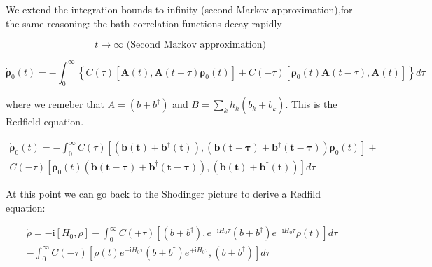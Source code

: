 \documentclass[reprint,aps,onecolumn,pra,notitlepage,nofootinbib]{revtex4-1}
\theoremstyle{definition}
\numberwithin{equation}{section}
\begin{document}
We extend the integration bounds
to infinity (second Markov approximation),for the same reasoning: the bath correlation
functions decay rapidly

\begin{equation}
t \rightarrow \infty \text { (Second Markov approximation) }
\end{equation}


\begin{equation}
\dot{\boldsymbol{\rho}}_0(t) = -\int_{0}^{\infty}\left\{C(\tau)\left[\boldsymbol{A}(t), \boldsymbol{A}(t-\tau) \boldsymbol{\rho}_{\mathrm{0}}(t)\right]+C(-\tau)\left[\boldsymbol{\rho}_{\mathrm{0}}(t) \boldsymbol{A}(t-\tau), \boldsymbol{A}(t)\right]\right\} d \tau
\end{equation}



where we remeber that $A= \left( b + b ^{\dagger} \right) $ and $B= \sum_k h_k \left( b_k + b_k ^{\dagger} \right)$. This is the Redfield equation. 


\begin{equation}\begin{align}
\dot{\boldsymbol{\rho}}_0(t) = - \int_{0}^{\infty} C(\tau)\left[\boldsymbol{\left( b(t) + b ^{\dagger}(t) \right)}, \left( \boldsymbol{ b(t-\tau) + b ^{\dagger} (t-\tau) }\right) \boldsymbol{\rho}_{\mathrm{0}}(t)\right]+ \\
C(-\tau)\left[\boldsymbol{\rho}_{\mathrm{0}}(t) \left( \boldsymbol{ b(t-\tau) + b ^{\dagger} (t-\tau) } \right), \boldsymbol{\left( b(t) + b ^{\dagger}(t) \right)}\right] d \tau 
\end{align}
\end{equation}






At this point we can go back to the Shodinger picture to derive a Redfild equation: 

\begin{equation}
\begin{aligned}
\dot{\rho}=-\mathrm{i}\left[H_{0}, \rho\right]-\int_{0}^{\infty} C(+\tau)\left[\left(b+b^{\dagger}\right), e^{-\mathrm{i} H_{0} \tau}\left(b+b^{\dagger}\right) e^{+\mathrm{i} H_{0} \tau} \rho(t)\right] d \tau \\
-\int_{0}^{\infty} C(-\tau)\left[\rho(t) e^{-\mathrm{i} H_{0} \tau}\left(b+b^{\dagger}\right) e^{+\mathrm{i} H_{0} \tau},\left(b+b^{\dagger}\right)\right] d \tau
\end{aligned}
\end{equation}
\end{document}
